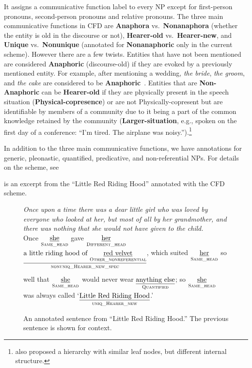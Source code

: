 \documentclass[11pt,letterpaper]{article}
\newcommand{\glosst}[2]{\ensuremath{\underset{\textrm{#2}}{\uline{\textrm{#1}}}}} %
\newcommand{\llbl}[1]{\mbox{\textsc{#1}}} %
\begin{document}
It assigns a communicative function label to every NP except for first-person pronouns, second-person pronouns and relative pronouns.
The three main communicative functions in CFD are {\bf Anaphora} vs.~{\bf Nonanaphora} 
(whether the entity is old in the discourse or not), {\bf Hearer-old} vs.~{\bf Hearer-new}, 
and {\bf Unique} vs.~{\bf Nonunique} (annotated for {\bf Nonanaphoric} only in the current scheme).  
However there are a few twists.   
Entities that have not been mentioned are considered {\bf Anaphoric} (discourse-old) 
if they are evoked by a previously mentioned entity.   
For example, after mentioning a wedding, {\em the bride}, {\em the groom}, and {\em the cake} 
are considered to be {\bf Anaphoric}~\citep{clark77,poesio98}.  
Entities that are {\bf Non-Anaphoric} can be {\bf Hearer-old} if they are physically present 
in the speech situation ({\bf Physical-copresence}) or are not Physically-copresent but are identifiable by members of a community due to it being a part of the common knowledge retained by the community ({\bf Larger-situation},
e.g., spoken on the first day of a conference: ``I'm tired. The airplane was noisy.'').\footnote{\citet{komen-13} also proposed a hierarchy with similar leaf nodes, but different internal structure.}  

In addition to the three main communicative functions, we have annotations for 
generic, pleonastic, quantified, predicative, and non-referential NPs. For details on the scheme, see \citet{bhatia14}  

 is an excerpt from the ``Little Red Riding Hood'' annotated with the CFD scheme.


\begin{figure*}[t]\small
\textit{Once upon a time there was a dear little girl who was loved by everyone who looked at her, but most of all by her grandmother, and there was nothing that she would not have given to the child.}
\\[5pt]
Once \glosst{she}{\llbl{Same\_head}} gave \glosst{her}{\llbl{Different\_head}} 
\glosst{a little riding hood of \glosst{red velvet}{\llbl{Other\_nonreferential}}}{$\underset{~}{\llbl{nonuniq\_Hearer\_new\_spec}}$}, 
which suited \glosst{her}{\llbl{Same\_head}} so well that \glosst{she}{\llbl{Same\_head}} 
would never wear \glosst{anything else}{\llbl{Quantified}}; so \glosst{she}{\llbl{Same\_head}} was always called 
`\glosst{Little Red Riding Hood}{\llbl{uniq\_Hearer\_new}}.'
\caption{An annotated sentence from ``Little Red Riding Hood.'' The previous sentence is shown for context.}
\label{fig:excerpt}
\end{figure*}
\end{document}
